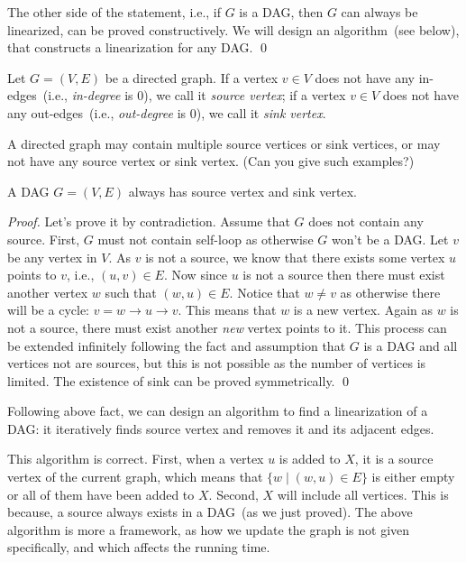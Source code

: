The other side of the statement, i.e., if $G$ is a DAG, then $G$ can always be linearized, can be proved constructively.
We will design an algorithm~(see below), that constructs a linearization for any DAG. \qed


Let $G = (V, E)$ be a directed graph. 
If a vertex $v\in V$ does not have any in-edges~(i.e., \emph{in-degree} is 0), we call it \emph{source vertex};
if a vertex $v\in V$ does not have any out-edges~(i.e., \emph{out-degree} is 0), we call it \emph{sink vertex}.

A directed graph may contain multiple source vertices or sink vertices,
or may not have any source vertex or sink vertex. (Can you give such examples?)

\begin{claim}
A DAG $G=(V,E)$ always has source vertex and sink vertex.
\end{claim}
\emph{Proof.} Let's prove it by contradiction. Assume that $G$ does not contain any source.
First, $G$ must not contain self-loop as otherwise $G$ won't be a DAG.
Let $v$ be any vertex in $V$. As $v$ is not a source, we know that there exists some vertex $u$ points to $v$, i.e., $(u,v)\in E$.
Now since $u$ is not a source then there must exist another vertex $w$ such that $(w,u)\in E$.
Notice that $w \neq v$ as otherwise there will be a cycle: $v = w \to u \to v$.
This means that $w$ is a new vertex. Again as $w$ is not a source, there must exist another \emph{new} vertex points to it.
This process can be extended infinitely following the fact and assumption that $G$ is a DAG and all vertices not are sources,
but this is not possible as the number of vertices is limited. 
The existence of sink can be proved symmetrically. \qed


Following above fact, we can design an algorithm to find a linearization of a DAG: it iteratively
finds source vertex and removes it and its adjacent edges.

\begin{algorithmblock}[0.8\textwidth]
	\xxx
	\xxx
	\xxx
	\xxx
	\xxx
	\xxx
\end{algorithmblock}

This algorithm is correct. First, when a vertex $u$ is added to $X$,
it is a source vertex of the current graph, which means that
$\{w\mid (w, u)\in E\}$ is either empty or all of them
have been added to $X$. Second, $X$ will include all vertices.
This is because, a source always exists in a DAG~(as we just proved).
The above algorithm is more a framework, as how we update the graph
is not given specifically, and which affects the running time.

